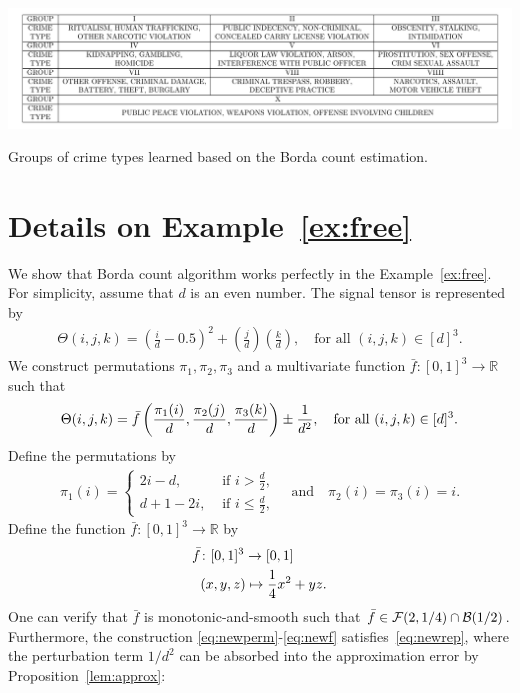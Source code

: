 \documentclass[12pt]{article}
\theoremstyle{definition}
\begin{document}
\begin{table}[ht!]
    \centering
    \includegraphics[width = \textwidth]{figure/crimetable.pdf}
    \caption{Groups of crime types learned based on the Borda count estimation.}
    \label{tb:crimetb}
\end{table}

{\color{blue}
\section{Details on Example~\ref{ex:free}}\label{sec:ex}
    We show that Borda count algorithm works perfectly in the Example~\ref{ex:free}. For simplicity, assume that $d$ is an even number. The signal tensor is represented by
    \begin{align}\label{eq:model6}
       \Theta(i,j,k) = \left(\frac{i}{d}-0.5\right)^2+\left(\frac{j}{d}\right)\left(\frac{k}{d}\right),\quad \text{for all }(i,j,k)\in[d]^3.
    \end{align}
    We construct permutations $\pi_1,\pi_2,\pi_3$ and a multivariate function $\bar f\colon [0,1]^3\rightarrow \mathbb{R}$ such that
    \begin{align}\label{eq:newrep}
        \Theta(i,j,k) = \bar f\left(\frac{\pi_1(i)}{d},\frac{\pi_2(j)}{d},\frac{\pi_3(k)}{d}\right)\pm{1\over d^2},\quad \text{for all }(i,j,k)\in[d]^3.
    \end{align}
Define the permutations by
    \begin{align}\label{eq:newperm}
        \pi_1(i) = \begin{cases}
            2i-d, &\text{ if } i> \frac{d}{2},\\ d+1-2i, &\text{ if } i\leq \frac{d}{2},
        \end{cases}\quad\text{and}\quad  \pi_2(i) = \pi_3 (i)= i.
    \end{align}
Define the function $\bar f\colon [0,1]^3\rightarrow \mathbb{R}$ by 
\begin{align}\label{eq:newf}
\bar f&\colon [0,1]^3\to [0,1]\notag \\
&(x,y,z)\mapsto {1\over 4} x^2+yz.
\end{align}
One can verify that $\bar f$ is monotonic-and-smooth such that $\bar f\in \mathcal{F}(2,1/4)\cap \mathcal{B}(1/2)$. Furthermore, the construction \eqref{eq:newperm}-\eqref{eq:newf} satisfies~\eqref{eq:newrep}, where the perturbation term $1/d^2$ can be absorbed into the approximation error by Proposition~\ref{lem:approx}:
}
\end{document}
